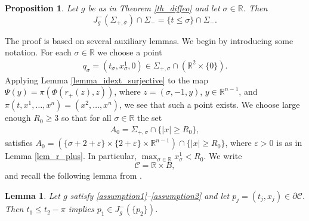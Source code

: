 \documentclass[11pt,letterpaper]{amsart}
\newtheorem{Lemma}[Theorem]{Lemma}
\newtheorem{Proposition}[Theorem]{Proposition}
\theoremstyle{definition}
\numberwithin{equation}{section}
\newcommand{\eps}{\varepsilon}
\newcommand{\p}{\partial}
\def\p{\partial}
\def\R{\mathbb R}
\begin{document}
\begin{Proposition} \label{prop_jminus}
Let $g$ be as in Theorem \ref{th_diffeo} and let $\sigma \in \R$.
Then 
\[
J_{g}^-(\Sigma_{+,\sigma}) \cap \Sigma_- = \{t \le \sigma\} \cap \Sigma_-.
\]
\end{Proposition}

The proof is based on several auxiliary lemmas. We begin by introducing some notation. For each $\sigma \in \R$ we choose a point  
    \begin{align*}
q_\sigma = (t_\sigma, x_\sigma^1, 0) \in \Sigma_{+,\sigma} \cap (\R^2 \times \{0\}).
    \end{align*}
Applying Lemma \ref{lemma_idext_surjective} to the map $\Psi(y) = \pi(\Phi(r_+(z), z))$, where $z = (\sigma, -1, y)$, $y \in \R^{n-1}$, and $\pi(t,x^1,\dots,x^n) = (x^2,\dots,x^n)$, we see that such a point exists. We choose large enough $R_0 \ge 3$ so that for all $\sigma \in \R$ the set 
    \begin{align*}%
A_0 = \Sigma_{+,\sigma} \cap \{|x| \ge R_0\}, 
    \end{align*}
satisfies $A_0 = (\{\sigma + 2 + \eps\} \times \{2 + \eps\} \times \R^{n-1}) \cap \{|x| \ge R_0\}$, where $\eps > 0$ is as in Lemma \ref{lem_r_plus}.
In particular, $\max_{\sigma \in \R} x_\sigma^1 < R_0$. 
We write
\[
\mathcal{C} = \R \times B,
\]
and recall the following lemma from \cite{oksanen2024}.

\begin{Lemma} \label{lemma_c_bd}
Let $g$ satisfy \eqref{assumption1}--\eqref{assumption2} and let $p_j = (t_j, x_j) \in \p \mathcal{C}$. Then $t_1 \leq t_2-\pi$ implies $p_1 \in J_g^-(\{p_2\})$. 
\end{Lemma}
\end{document}
